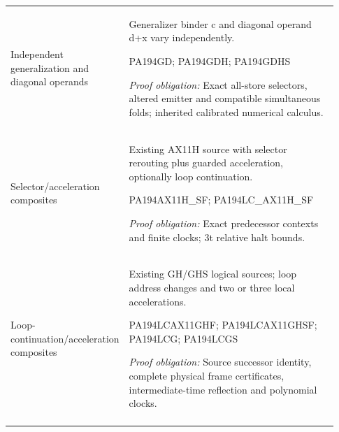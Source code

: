\begin{longtable}{>{\raggedright\arraybackslash}p{0.23\linewidth}>{\raggedright\arraybackslash}p{0.70\linewidth}}
Independent generalization and diagonal operands & Generalizer binder c and diagonal operand d+x vary independently. \par\smallskip PA194GD; PA194GDH; PA194GDHS \par\smallskip\emph{Proof obligation:} Exact all-store selectors, altered emitter and compatible simultaneous folds; inherited calibrated numerical calculus.\\\addlinespace[5pt]
Selector/\allowbreak{}acceleration composites & Existing AX11H source with selector rerouting plus guarded acceleration, optionally loop continuation. \par\smallskip PA194AX11H\_SF; PA194LC\_AX11H\_SF \par\smallskip\emph{Proof obligation:} Exact predecessor contexts and finite clocks; 3t relative halt bounds.\\\addlinespace[5pt]
Loop-continuation/\allowbreak{}acceleration composites & Existing GH/\allowbreak{}GHS logical sources; loop address changes and two or three local accelerations. \par\smallskip PA194LCAX11GHF; PA194LCAX11GHSF; PA194LCG; PA194LCGS \par\smallskip\emph{Proof obligation:} Source successor identity, complete physical frame certificates, intermediate-time reflection and polynomial clocks.\\\addlinespace[5pt]
\end{longtable}
\endgroup
